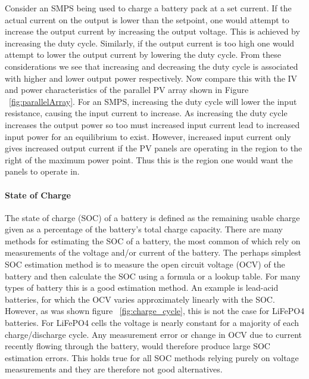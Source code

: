 \documentclass[a4paper]{article}
\begin{document}
Consider an SMPS being used to charge a battery pack at a set current. If 
the actual current on the output is lower than the setpoint, one would 
attempt to increase the output current by increasing the output voltage. 
This is achieved by increasing the duty cycle. Similarly, if the output 
current is too high one would attempt to lower the output current by 
lowering the duty cycle. From these considerations we see that increasing 
and decreasing the duty cycle is associated with higher and lower output power 
respectively. Now compare this with the IV and power characteristics of the 
parallel PV array shown in Figure ~\ref{fig:parallelArray}. For an SMPS, 
increasing the duty cycle will lower the input resistance, causing the input 
current to increase. As increasing the duty cycle increases the output 
power so too must increased input current lead to increased input power for 
an equilibrium to exist. However, increased input current only gives increased 
output current if the PV panels are operating in the region to the right of the 
maximum power point. Thus this is the region one would want the panels to operate in. 

\paragraph*{State of Charge}
\vspace{-6pt}
The state of charge (SOC) of a battery is defined as the remaining usable charge 
given as a percentage of the battery’s total charge capacity\cite{DICKINSON2009452}. There are many 
methods for  estimating the SOC of a battery, the most common of which rely on 
measurements of the voltage and/or current of the battery\cite{DANKO2019186}. The perhaps 
simplest SOC estimation method is to measure the open circuit voltage (OCV) 
of the battery and then calculate the SOC using a formula or a lookup table. 
For many types of battery this is a good estimation method. An example is 
lead-acid batteries, for which the OCV varies approximately linearly with the 
SOC. However, as was shown figure ~\ref{fig:charge_cycle}, this is not the case 
for LiFePO4 batteries. For LiFePO4 cells the voltage is nearly constant for 
a majority of each charge/discharge cycle. Any measurement error or change in 
OCV due to current recently flowing through the battery, would therefore produce large 
SOC estimation errors. This holds true for all SOC methods relying purely on 
voltage measurements and they are therefore not good alternatives. 
\end{document}
